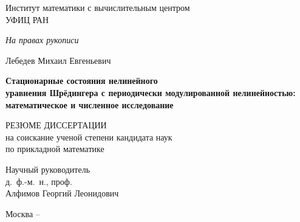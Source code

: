 \documentclass[candidate, href, colorlinks]{disser}
\begin{document}
\begin{titlepage}
\thispagestyle{empty}
\enlargethispage{1cm}
\vspace*{-2cm}

\begin{center}
	Институт математики с вычислительным центром \\ УФИЦ РАН
\end{center}

\vskip1cm
	
\begin{flushright}
	\emph{На правах рукописи}
\end{flushright}
	
\vskip3cm

\begin{center}
	{\large Лебедев Михаил Евгеньевич}
	\vskip1cm
	{\Large\bfseries Стационарные состояния нелинейного \\ уравнения Шрёдингера с периодически модулированной нелинейностью: \\ математическое и численное исследование \par}
	\vskip1.5cm
	{РЕЗЮМЕ ДИССЕРТАЦИИ \\ на соискание ученой степени кандидата наук \\ по прикладной математике}
\end{center}

\vskip2cm

\hspace{8cm}\begin{minipage}{0.4\linewidth}
	Научный руководитель \\
	д.~ф.-м.~н., проф. \\
	Алфимов Георгий Леонидович
\end{minipage}

\vfill

\begin{center}
	{Москва -- \the\year}
\end{center}

\normalfont\clearpage
\end{titlepage}
\end{document}
